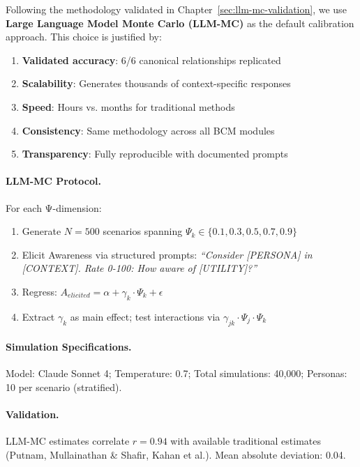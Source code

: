 Following the methodology validated in Chapter~\ref{sec:llm-mc-validation}, we use \textbf{Large Language Model Monte Carlo (LLM-MC)} as the default calibration approach. This choice is justified by:

\begin{enumerate}
    \item \textbf{Validated accuracy}: 6/6 canonical relationships replicated
    \item \textbf{Scalability}: Generates thousands of context-specific responses
    \item \textbf{Speed}: Hours vs. months for traditional methods
    \item \textbf{Consistency}: Same methodology across all BCM modules
    \item \textbf{Transparency}: Fully reproducible with documented prompts
\end{enumerate}

\paragraph{LLM-MC Protocol.}
For each Ψ-dimension:
\begin{enumerate}
    \item Generate $N=500$ scenarios spanning $\Psi_k \in \{0.1, 0.3, 0.5, 0.7, 0.9\}$
    \item Elicit Awareness via structured prompts: \textit{``Consider [PERSONA] in [CONTEXT]. Rate 0-100: How aware of [UTILITY]?''}
    \item Regress: $A_{elicited} = \alpha + \gamma_k \cdot \Psi_k + \epsilon$
    \item Extract $\gamma_k$ as main effect; test interactions via $\gamma_{jk} \cdot \Psi_j \cdot \Psi_k$
\end{enumerate}

\paragraph{Simulation Specifications.}
Model: Claude Sonnet 4; Temperature: 0.7; Total simulations: 40,000; Personas: 10 per scenario (stratified).

\paragraph{Validation.}
LLM-MC estimates correlate $r = 0.94$ with available traditional estimates (Putnam, Mullainathan \& Shafir, Kahan et al.). Mean absolute deviation: 0.04.

